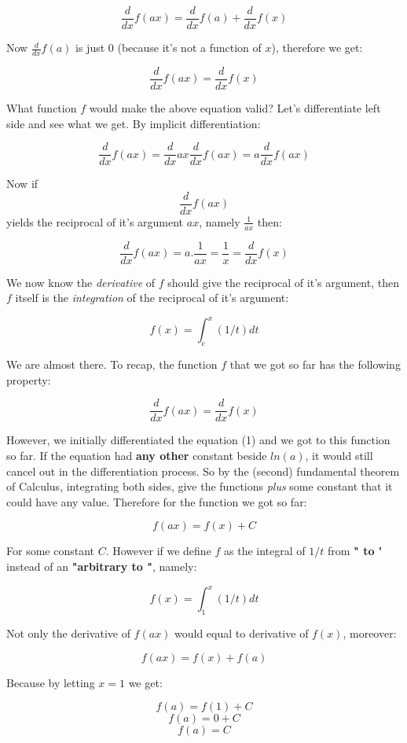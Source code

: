 \documentclass{article}
\begin{document}
	$$ \frac{d}{dx} f(ax) = \frac{d}{dx} f(a) + \frac{d}{dx} f(x) $$
	
	Now $\frac{d}{dx} f(a)$ is just $0$ (because it's not a function of $x$), therefore we get:
	
	$$ \frac{d}{dx} f(ax) = \frac{d}{dx} f(x) $$
	
	What function $f$ would make the above equation valid? Let's differentiate left side and see what we get. By implicit differentiation:
	
	$$ \frac{d}{dx} f(ax) = \frac{d}{dx} ax \frac{d}{dx} f(ax) = a \frac{d}{dx} f(ax) $$
	
	Now if $$\frac{d}{dx} f(ax) $$ yields the reciprocal of it's argument $ax$, namely $\frac{1}{ax}$ then:
	
	$$ \frac{d}{dx} f(ax) =  a . \frac{1}{ax} = \frac{1}{x} = \frac{d}{dx} f(x) $$
	
	We now know the \textit{derivative} of $f$ should give the reciprocal of it's argument, then $f$ itself is the \textit{integration} of the reciprocal of it's argument:
	
	$$f(x) = \int_{c}^{x} (1/t) dt$$
	
	We are almost there. To recap, the function $f$ that we got so far has the following property:
	
	$$ \frac{d}{dx} f(ax) = \frac{d}{dx} f(x) $$
	
	However, we initially differentiated the equation (1) and we got to this function so far. If the equation had \textbf{any other} constant beside $ln(a)$, it would still cancel out in the differentiation process. So by the (second) fundamental theorem of Calculus, integrating both sides, give the functions \textit{plus} some constant that it could have any value. Therefore for the function we got so far:
	
	$$ f(ax) = f(x) + C $$
	
	For some constant $C$. However if we define $f$ as the integral of $1/t$ from \textbf{" to }"  instead of an \textbf{"arbitrary  to "}, namely:
	
	$$f(x) = \int_{1}^{x} (1/t) dt$$
	
	Not only the derivative of $f(ax)$ would equal to derivative of $f(x)$, moreover:

	$$ f(ax) = f(x) + f(a)$$
	
	Because by letting $x = 1$ we get:
	
	$$ f(a) = f(1) + C$$
	$$ f(a) = 0 + C$$
	$$ f(a) = C $$
	
\end{document}
